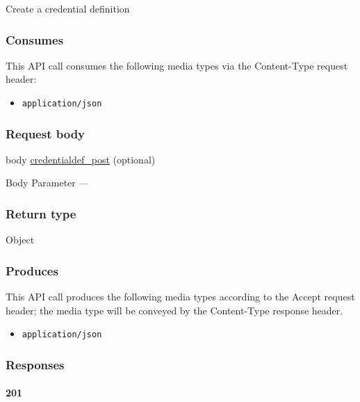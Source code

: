 Create a credential definition

\hypertarget{consumes-11}{%
\subsubsection{Consumes}\label{consumes-11}}

This API call consumes the following media types via the {Content-Type}
request header:

\begin{itemize}
\tightlist
\item
  \texttt{application/json}
\end{itemize}

\hypertarget{request-body-11}{%
\subsubsection{Request body}\label{request-body-11}}

body \protect\hyperlink{credentialdef_post}{credentialdef\_post}
(optional)

{Body Parameter} ---

\hypertarget{return-type-27}{%
\subsubsection{Return type}\label{return-type-27}}

Object

\hypertarget{produces-34}{%
\subsubsection{Produces}\label{produces-34}}

This API call produces the following media types according to the
{Accept} request header; the media type will be conveyed by the
{Content-Type} response header.

\begin{itemize}
\tightlist
\item
  \texttt{application/json}
\end{itemize}

\hypertarget{responses-34}{%
\subsubsection{Responses}\label{responses-34}}

\hypertarget{section-114}{%
\paragraph{201}\label{section-114}}

